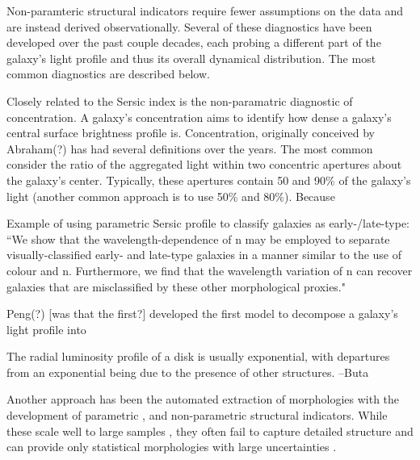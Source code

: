 Non-paramteric structural indicators require fewer assumptions on the data and are instead derived observationally. Several of these diagnostics have been developed over the past couple decades, each probing a different part of the galaxy's light profile and thus its overall dynamical distribution. The most common diagnostics are described below. 

Closely related to the Sersic index is the non-paramatric diagnostic of concentration. A galaxy's concentration aims to identify how dense a galaxy's central surface brightness profile is. Concentration, originally conceived by Abraham(?) has had several definitions over the years. The most common consider the ratio of the aggregated light within two concentric apertures about the galaxy's center. Typically, these apertures contain 50 and 90\% of the galaxy's light (another common approach is to use 50\% and 80\%). Because 


Example of using parametric Sersic profile to classify galaxies as early-/late-type:
``We show that the wavelength-dependence of n may be employed to separate visually-classified early- and late-type galaxies in a manner similar to the use of colour and n. Furthermore, we find that the wavelength variation of n can recover galaxies that are misclassified by these other morphological proxies."\citep{Vika2015}

Peng(?) [was that the first?] developed the first model to decompose a galaxy's light profile into 

The radial luminosity profile of a disk is usually exponential, with departures from an
exponential being due to the presence of other structures. --Buta

Another approach has been the automated extraction of morphologies with the development of parametric \citep{Sersic1968, Odewahn2002, Peng2002}, and non-parametric 
\citep{Abraham1994, 
	   Conselice2003, 
	   Abraham2003, 
	   Lotz2004,  
	   Freeman2013} 
structural indicators. While these scale well to large samples 
\citep[e.g.,][]{Simard2011, 
			Griffith2012, 
			Casteels2014, 
			Holwerda2014, 
			Meert2016}, 
they often fail to capture detailed structure and can provide only statistical morphologies with large uncertainties \cite[e.g.,][]{Abraham1996, Bershady2000}. 


